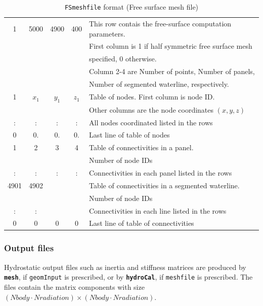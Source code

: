 \documentclass[12pt,a4paper,titlepage]{article}
\begin{document}
\begin{table}[ht]
\begin{center}
\caption{\texttt{FSmeshfile} format (Free surface mesh file)}\label{tab:FSmeshfile}
\begin{tabular}{ccccl}
\hline
1 & 5000&4900&400& This row contais the free-surface computation parameters.\\
\ &\ &\ &\ &  First column is 1 if half symmetric free surface mesh\\
\ &\ &\ &\ & specified, 0 otherwise.\\
\ &\ &\ &\ &  Column 2-4 are Number of points, Number of panels,\\
\ &\ &\ &\ &  Number of segmented waterline, respectively.\\
\hline
1 & $x_1$& $y_1$ &$z_1$ & Table of nodes. First column is node ID.\\
\ &\ &\ &\ &Other columns are the node coordinates $(x,y,z)$\\
\hline
: & :&  :& : & All nodes coordinated listed in the rows\\
\hline
0 & 0.&  0.& 0.& Last line of table of nodes\\
\hline
1 & 2& 3 & 4 & Table of connectivities in a panel.\\
\ &\ &\ &\ & Number of node IDs\\
\hline
: & :&  :& : & Connectivities in each panel listed in the rows\\
\hline
4901 & 4902& \ & \ & Table of connectivities in a segmented waterline.\\
\ &\ &\ &\ & Number of node IDs\\
\hline
: & :&  & & Connectivities in each line listed in the rows\\
\hline
0 & 0&  0& 0& Last line of table of connectivities\\
\hline
\end{tabular}
\end{center}
\end{table}


\subsubsection{Output files}
{Hydrostatic output files} such as inertia and stiffness matrices are produced by \textbf{\texttt{mesh}}, if \texttt{geomInput} is prescribed, or by \textbf{\texttt{hydroCal}}, if \texttt{meshfile} is prescribed. The files contain the matrix components with size $(Nbody\cdot Nradiation)\times (Nbody\cdot Nradiation)$.
\end{document}
